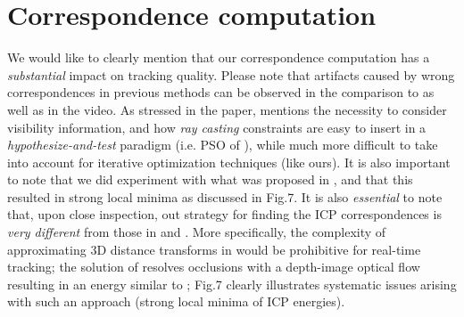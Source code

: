 \documentclass{egpubl}
\begin{document}
\section{Correspondence computation}
We would like to clearly mention that our correspondence computation has a \emph{substantial} impact on tracking quality. Please note that artifacts caused by wrong correspondences in previous methods can be observed in the comparison to \cite[Fig.18]{schroeder_icra14} \cite[Fig.19]{melax_13} as well as in the video. As stressed in the paper, \cite{ganapathi_eccv12} mentions the necessity to consider visibility information, and how \emph{ray casting} constraints are easy to insert in a \emph{hypothesize-and-test} paradigm (i.e. PSO of \cite{qian_cvpr14}), while much more difficult to take into account for iterative optimization techniques (like ours). It is also important to note that we did experiment with what was proposed in \cite{ganapathi_eccv12}, and that this resulted in strong local minima as discussed in Fig.7. It is also \emph{essential} to note that, upon close inspection, out strategy for finding the ICP correspondences is \textit{very different} from those in \cite{wei_siga12} and \cite{zhang_siga14}. More specifically, the complexity of approximating 3D distance transforms in \cite{zhang_siga14} would be prohibitive for real-time tracking; the solution of \cite{wei_siga12} resolves occlusions with a depth-image optical flow resulting in an energy similar to \cite{ganapathi_eccv12}; Fig.7 clearly illustrates systematic issues arising with such an approach (strong local minima of ICP energies).




\end{document}
